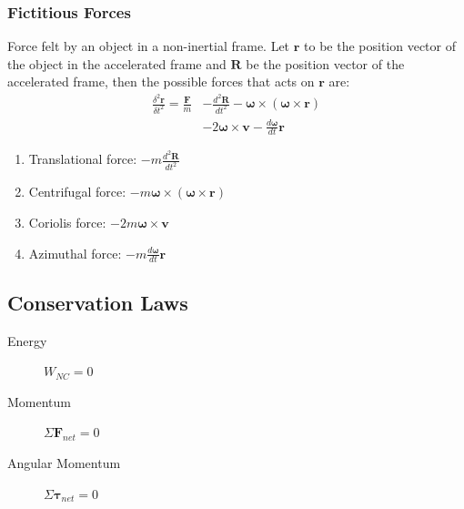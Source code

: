 \documentclass[11pt]{article}
\newcommand{\ve}[1]{\ensuremath{\bm{#1}}}			%
\begin{document}
\begin{multicols*}{3}
\subsubsection{Fictitious Forces}
Force felt by an object in a non-inertial frame. Let $\ve{r}$ to be the position vector of the object in the accelerated frame and $\ve{R}$ be the position vector of the accelerated frame, then the possible forces that acts on $\ve{r}$ are:
	\begin{align*}
	\frac{\delta^2\ve{r}}{\delta t ^2} = \frac{\ve{F}}{m}
	&- \frac{d^2\ve{R}}{dt^2}
	- \ve{\omega} \times (\ve{\omega}\times\ve{r})\\
	&- 2\ve{\omega} \times \ve{v}
	- \frac{d\ve{\omega}}{dt} \ve{r}
	\end{align*}
\begin{enumerate}
\item Translational force: $- m\frac{d^2\ve{R}}{dt^2}$
\item Centrifugal force: $-m\ve{\omega} \times (\ve{\omega}\times\ve{r})$
\item Coriolis force: $-2m\ve{\omega} \times \ve{v}$
\item Azimuthal force: $-m \frac{d\ve{\omega}}{dt} \ve{r}$
\end{enumerate}
\subsection{Conservation Laws}
\begin{description}
\item[Energy] $W_{NC} = 0$
\item[Momentum] $\Sigma \ve{F}_{net} = 0$ 
\item[Angular Momentum] $\Sigma \ve{\tau}_{net} = 0$ 
\end{description}

\end{multicols*}
\end{document}
